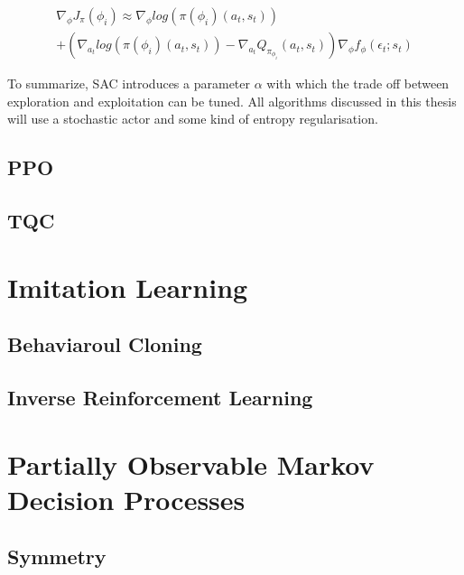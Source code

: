 \begin{equation}
    \begin{align}
        \nabla_{\phi}J_\pi(\phi_{i}) \approx \nabla_{\phi} log (\pi(\phi_{i})(a_t, s_t))\\
        + \left( \nabla_{a_t} log (\pi(\phi_{i})(a_t, s_t)) - \nabla_{a_t} Q_{\pi_{\phi_{i}}}(a_t, s_t) \right) \nabla_{\phi} f_{\phi}(\epsilon_t;s_t)
    \end{align}
\end{equation}

To summarize, SAC introduces a parameter $\alpha$ with which the trade off between exploration and exploitation can be tuned. All algorithms discussed in this thesis will use a stochastic 
actor and some kind of entropy regularisation.
\subsection{PPO}

\subsection{TQC}

\section{Imitation Learning}

\subsection{Behaviaroul Cloning}

\subsection{Inverse Reinforcement Learning}

\section{Partially Observable Markov Decision Processes}

\subsection{Symmetry}